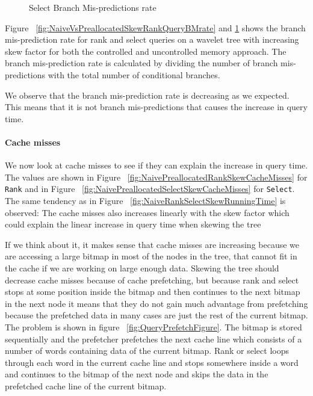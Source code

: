 \begin{figure}
\caption{Select Branch Mis-predictions rate}
\label{fig:NaiveVsPreallocatedSkewSelectQueryBMrate}

\end{figure}
 
Figure ~\ref{fig:NaiveVsPreallocatedSkewRankQueryBMrate} and \ref{fig:NaiveVsPreallocatedSkewSelectQueryBMrate} shows the branch mis-prediction rate for rank and select queries on a wavelet tree with increasing skew factor for both the controlled and uncontrolled memory approach. 
The branch mis-prediction rate is calculated by dividing the number of branch mis-predictions with the total number of conditional branches.

We observe that the branch mis-prediction rate is decreasing as we expected. 
This means that it is not branch mis-predictions that causes the increase in query time. 


\paragraph{Cache misses}
We now look at cache misses to see if they can explain the increase in query time. 
The values are shown in Figure ~\ref{fig:NaivePreallocatedRankSkewCacheMisses} for \texttt{Rank} and in Figure ~\ref{fig:NaivePreallocatedSelectSkewCacheMisses} for \texttt{Select}.
The same tendency as in Figure ~\ref{fig:NaiveRankSelectSkewRunningTime} is observed: 
The cache misses also increases linearly with the skew factor which could explain the linear increase in query time when skewing the tree

If we think about it, it makes sense that cache misses are increasing because we are accessing a large bitmap in most of the nodes in the tree, that cannot fit in the cache if we are working on large enough data.
Skewing the tree should decrease cache misses because of cache prefetching, but because rank and select stops at some position inside the bitmap and then continues to the next bitmap in the next node it means that they do not gain much advantage from prefetching because the prefetched data in many cases are just the rest of the current bitmap. 
The problem is shown in figure ~\ref{fig:QueryPrefetchFigure}. The bitmap is stored sequentially and the prefetcher prefetches the next cache line which consists of a number of words containing data of the current bitmap.
Rank or select loops through each word in the current cache line and stops somewhere inside a word and continues to the bitmap of the next node and skips the data in the prefetched cache line of the current bitmap.

